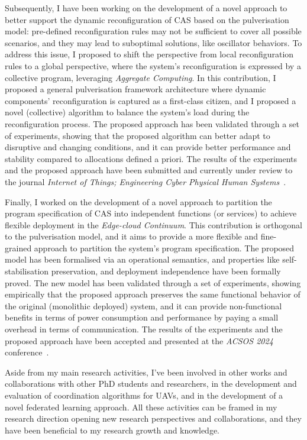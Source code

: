 \documentclass[runningheads]{llncs}
\begin{document}
Subsequently,
I have been working on the development of a novel approach to better support the dynamic reconfiguration of CAS based on the pulverisation model:
pre-defined reconfiguration rules may not be sufficient to cover all possible scenarios,
and they may lead to suboptimal solutions,
like oscillator behaviors.
%
To address this issue,
I proposed to shift the perspective from local reconfiguration rules to a global perspective,
where the system's reconfiguration is expressed by a collective program,
leveraging \emph{Aggregate Computing}.
%
In this contribution,
I proposed a general pulverisation framework architecture where dynamic components' reconfiguration is captured as a first-class citizen,
and I proposed a novel (collective) algorithm to balance the system's load during the reconfiguration process.
%
The proposed approach has been validated through a set of experiments,
showing that the proposed algorithm can better adapt to disruptive and changing conditions,
and it can provide better performance and stability compared to allocations defined a priori.
%
The results of the experiments and the proposed approach have been submitted and currently under review to the journal \emph{Internet of Things; Engineering Cyber Physical Human Systems}~\cite{farabegoli4798700dynamic}.

Finally,
I worked on the development of a novel approach to partition the program specification of CAS into independent functions (or services) to achieve flexible deployment in the \emph{Edge-cloud Continuum}.
%
This contribution is orthogonal to the pulverisation model,
and it aims to provide a more flexible and fine-grained approach to partition the system's program specification.
%
The proposed model has been formalised via an operational semantics,
and properties like self-stabilisation preservation, and deployment independence have been formally proved.
%
The new model has been validated through a set of experiments,
showing empirically that the proposed approach preserves the same functional behavior of the original (monolithic deployed) system,
and it can provide non-functional benefits in terms of power consumption and performance by paying a small overhead in terms of communication.
%
The results of the experiments and the proposed approach have been accepted and presented at the \emph{ACSOS 2024} conference~\cite{DBLP:conf/acsos/FarabegoliFAVE24}.

Aside from my main research activities,
I've been involved in other works and collaborations with other PhD students and researchers,
in the development and evaluation of coordination algorithms for UAVs,
and in the development of a novel federated learning approach.
%
All these activities can be framed in my research direction opening new research perspectives and collaborations,
and they have been beneficial to my research growth and knowledge.
\end{document}
